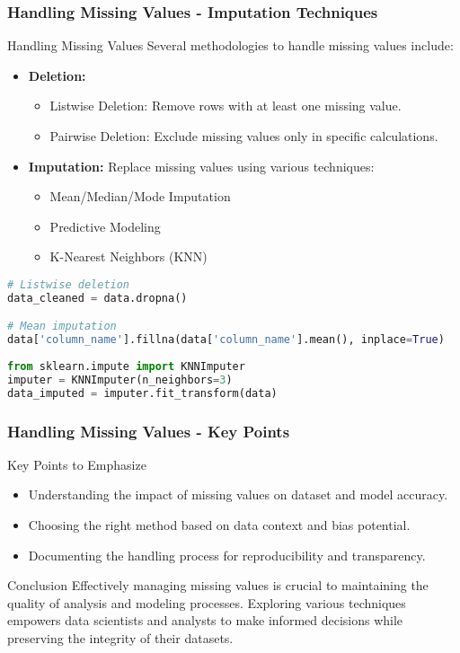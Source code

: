\documentclass[aspectratio=169]{beamer}
\begin{document}
\begin{frame}[fragile]
    \frametitle{Handling Missing Values - Imputation Techniques}
    \begin{block}{Handling Missing Values}
        Several methodologies to handle missing values include:
        \begin{itemize}
            \item \textbf{Deletion:}
            \begin{itemize}
                \item Listwise Deletion: Remove rows with at least one missing value.
                \item Pairwise Deletion: Exclude missing values only in specific calculations.
            \end{itemize}
            \item \textbf{Imputation:} Replace missing values using various techniques:
            \begin{itemize}
                \item Mean/Median/Mode Imputation
                \item Predictive Modeling
                \item K-Nearest Neighbors (KNN)
            \end{itemize}
        \end{itemize}
    \end{block}
    
    \begin{lstlisting}[language=Python]
# Listwise deletion
data_cleaned = data.dropna()

# Mean imputation
data['column_name'].fillna(data['column_name'].mean(), inplace=True)
    
from sklearn.impute import KNNImputer
imputer = KNNImputer(n_neighbors=3)
data_imputed = imputer.fit_transform(data)
    \end{lstlisting}
\end{frame}

\begin{frame}[fragile]
    \frametitle{Handling Missing Values - Key Points}
    \begin{block}{Key Points to Emphasize}
        \begin{itemize}
            \item Understanding the impact of missing values on dataset and model accuracy.
            \item Choosing the right method based on data context and bias potential.
            \item Documenting the handling process for reproducibility and transparency.
        \end{itemize}
    \end{block}
    
    \begin{block}{Conclusion}
        Effectively managing missing values is crucial to maintaining the quality of analysis and modeling processes. Exploring various techniques empowers data scientists and analysts to make informed decisions while preserving the integrity of their datasets.
    \end{block}
\end{frame}
\end{document}
